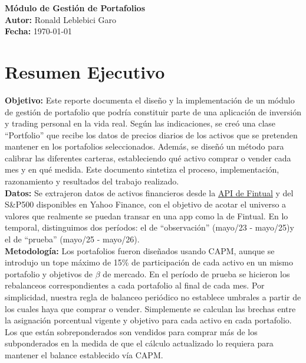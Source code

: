 \documentclass[11pt, a4paper]{article}
\begin{document}
\noindent
\textbf{Módulo de Gestión de Portafolios} \\
\textbf{Autor:} Ronald Leblebici Garo \\
\textbf{Fecha:} \today \\
\vspace{0.5cm}

\section{Resumen Ejecutivo}

\textbf{Objetivo:} Este reporte documenta el diseño y la implementación de un módulo de gestión de portafolio que podría constituir parte de una aplicación de inversión y trading personal en la vida real. Según las indicaciones, se creó una clase ``Portfolio'' que recibe los datos de precios diarios de los activos que se pretenden mantener en los portafolios seleccionados. Además, se diseñó un método para calibrar las diferentes carteras, estableciendo qué activo comprar o vender cada mes y en qué medida. Este documento sintetiza el proceso, implementación, razonamiento y resultados del trabajo realizado. \\

\textbf{Datos:} Se extrajeron datos de activos financieros desde la \href{https://fintual.cl/api-docs/index.html}{API de Fintual} y del S\&P500 disponibles en Yahoo Finance, con el objetivo de acotar el universo a valores que realmente se puedan transar en una app como la de Fintual. En lo temporal, distinguimos dos períodos: el de ``observación'' (mayo/23 - mayo/25)y el de ``prueba'' (mayo/25 - mayo/26). \\

\textbf{Metodología:} Los portafolios fueron diseñados usando CAPM, aunque se introdujo un tope máximo de 15\% de participación de cada activo en un mismo portafolio y objetivos de $\beta$ de mercado. En el período de prueba se hicieron los rebalanceos correspondientes a cada portafolio al final de cada mes. Por simplicidad, nuestra regla de balanceo periódico no establece umbrales a partir de los cuales haya que comprar o vender. Simplemente se calculan las brechas entre la asignación porcentual vigente y objetivo para cada activo en cada portafolio. Los que están sobreponderados son vendidos para comprar más de los subponderados en la medida de que el cálculo actualizado lo requiera para mantener el balance establecido vía CAPM. \\
\end{document}
